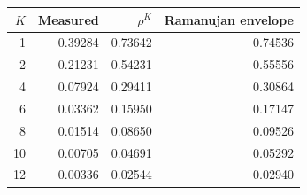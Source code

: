 \begin{tabular}{rrrr}
\toprule
$K$ & Measured & $\rho^K$ & Ramanujan envelope \\
\midrule
1 & 0.39284 & 0.73642 & 0.74536 \\
2 & 0.21231 & 0.54231 & 0.55556 \\
4 & 0.07924 & 0.29411 & 0.30864 \\
6 & 0.03362 & 0.15950 & 0.17147 \\
8 & 0.01514 & 0.08650 & 0.09526 \\
10 & 0.00705 & 0.04691 & 0.05292 \\
12 & 0.00336 & 0.02544 & 0.02940 \\
\bottomrule
\end{tabular}